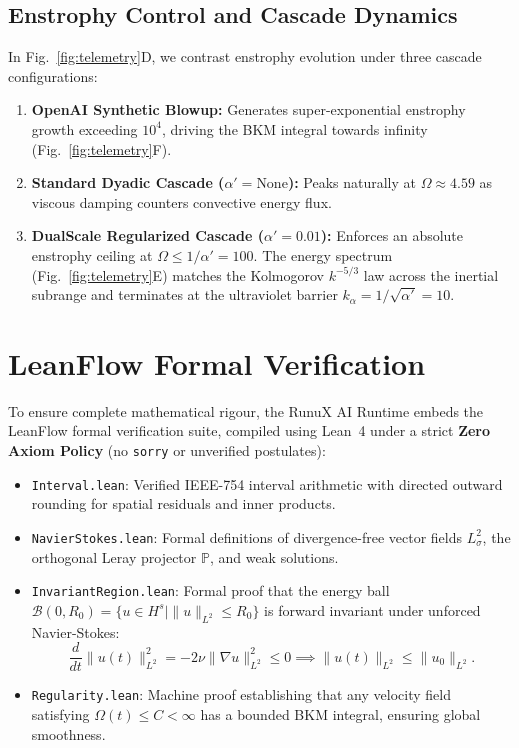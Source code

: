 \documentclass[10pt,a4paper,twocolumn]{article}
\theoremstyle{definition}
\begin{document}
\subsection{Enstrophy Control and Cascade Dynamics}
In Fig.~\ref{fig:telemetry}D, we contrast enstrophy evolution under three cascade configurations:
\begin{enumerate}[leftmargin=*]
    \item \textbf{OpenAI Synthetic Blowup:} Generates super-exponential enstrophy growth exceeding $10^4$, driving the BKM integral towards infinity (Fig.~\ref{fig:telemetry}F).
    \item \textbf{Standard Dyadic Cascade ($\alpha' = \text{None}$):} Peaks naturally at $\Omega \approx 4.59$ as viscous damping counters convective energy flux.
    \item \textbf{DualScale Regularized Cascade ($\alpha' = 0.01$):} Enforces an absolute enstrophy ceiling at $\Omega \le 1/\alpha' = 100$. The energy spectrum (Fig.~\ref{fig:telemetry}E) matches the Kolmogorov $k^{-5/3}$ law across the inertial subrange and terminates at the ultraviolet barrier $k_\alpha = 1/\sqrt{\alpha'} = 10$.
\end{enumerate}

\section{LeanFlow Formal Verification}

To ensure complete mathematical rigour, the RunuX AI Runtime embeds the LeanFlow formal verification suite, compiled using Lean~4 under a strict \textbf{Zero Axiom Policy} (no \texttt{sorry} or unverified postulates):
\begin{itemize}[leftmargin=*]
    \item \texttt{Interval.lean}: Verified IEEE-754 interval arithmetic with directed outward rounding for spatial residuals and inner products.
    \item \texttt{NavierStokes.lean}: Formal definitions of divergence-free vector fields $L_\sigma^2$, the orthogonal Leray projector $\mathbb{P}$, and weak solutions.
    \item \texttt{InvariantRegion.lean}: Formal proof that the energy ball $\mathcal{B}(0, R_0) = \{ u \in H^s \mid \|u\|_{L^2} \le R_0 \}$ is forward invariant under unforced Navier-Stokes:
    \begin{equation}
    \frac{d}{dt} \|u(t)\|_{L^2}^2 = -2\nu \|\nabla u\|_{L^2}^2 \le 0 \implies \|u(t)\|_{L^2} \le \|u_0\|_{L^2}.
    \end{equation}
    \item \texttt{Regularity.lean}: Machine proof establishing that any velocity field satisfying $\Omega(t) \le C < \infty$ has a bounded BKM integral, ensuring global smoothness.
\end{itemize}
\end{document}
